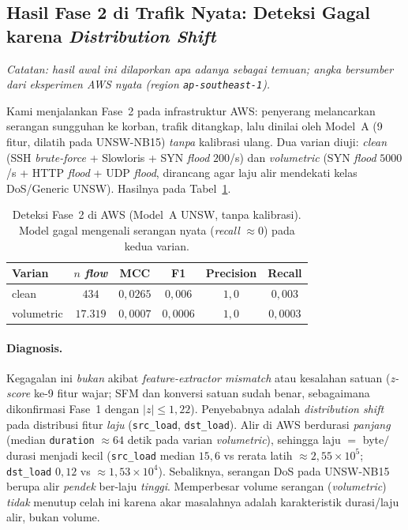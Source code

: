 \documentclass[11pt,a4paper]{article}
\begin{document}
\subsection{Hasil Fase 2 di Trafik Nyata: Deteksi Gagal karena \emph{Distribution Shift}}
\label{sec:rt-phase2}

\noindent\emph{Catatan: hasil awal ini dilaporkan apa adanya sebagai temuan; angka
bersumber dari eksperimen AWS nyata (region \texttt{ap-southeast-1}).}

Kami menjalankan Fase~2 pada infrastruktur AWS: penyerang melancarkan serangan
sungguhan ke korban, trafik ditangkap, lalu dinilai oleh Model~A (9 fitur,
dilatih pada UNSW-NB15) \emph{tanpa} kalibrasi ulang. Dua varian diuji:
\emph{clean} (SSH \emph{brute-force} + Slowloris + SYN \emph{flood} $200$/s) dan
\emph{volumetric} (SYN \emph{flood} $5000$/s + HTTP \emph{flood} + UDP \emph{flood},
dirancang agar laju alir mendekati kelas DoS/Generic UNSW). Hasilnya pada
Tabel~\ref{tab:rt-detect}.

\begin{table}[h]
\centering
\caption{Deteksi Fase~2 di AWS (Model~A UNSW, tanpa kalibrasi). Model gagal
mengenali serangan nyata (\emph{recall} $\approx 0$) pada kedua varian.}
\label{tab:rt-detect}
\small
\begin{tabular}{lccccc}
\toprule
Varian & $n$ \emph{flow} & MCC & F1 & Precision & Recall \\
\midrule
clean       & $434$    & $0{,}0265$ & $0{,}006$  & $1{,}0$ & $0{,}003$ \\
volumetric  & $17{.}319$ & $0{,}0007$ & $0{,}0006$ & $1{,}0$ & $0{,}0003$ \\
\bottomrule
\end{tabular}
\end{table}

\paragraph{Diagnosis.} Kegagalan ini \emph{bukan} akibat \emph{feature-extractor
mismatch} atau kesalahan satuan (\emph{z-score} ke-9 fitur wajar; SFM dan konversi
satuan sudah benar, sebagaimana dikonfirmasi Fase~1 dengan $|z|\le 1{,}22$).
Penyebabnya adalah \emph{distribution shift} pada distribusi fitur \emph{laju}
(\texttt{src\_load}, \texttt{dst\_load}). Alir di AWS berdurasi \emph{panjang}
(median \texttt{duration} $\approx 64$ detik pada varian \emph{volumetric}), sehingga
laju $=$ byte$/$durasi menjadi kecil (\texttt{src\_load} median $15{,}6$ vs rerata
latih $\approx 2{,}55\times10^{5}$; \texttt{dst\_load} $0{,}12$ vs $\approx 1{,}53\times10^{4}$).
Sebaliknya, serangan DoS pada UNSW-NB15 berupa alir \emph{pendek} ber-laju
\emph{tinggi}. Memperbesar volume serangan (\emph{volumetric}) \emph{tidak} menutup
celah ini karena akar masalahnya adalah karakteristik durasi/laju alir, bukan volume.
\end{document}
